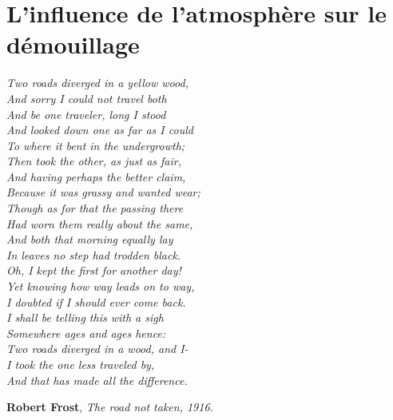\documentclass[12pt,french]{report}
\begin{document}
\setcounter{chapter}{3}
\chapter{L'influence de l'atmosphère sur le démouillage}
\begin{flushleft}
\textit{
Two roads diverged in a yellow wood,\\
And sorry I could not travel both\\
And be one traveler, long I stood\\
And looked down one as far as I could\\
To where it bent in the undergrowth;\\
\vspace{12pt}
Then took the other, as just as fair,\\
And having perhaps the better claim,\\
Because it was grassy and wanted wear;\\
Though as for that the passing there\\
Had worn them really about the same,\\
\vspace{12pt}
And both that morning equally lay\\
In leaves no step had trodden black.\\
Oh, I kept the first for another day!\\
Yet knowing how way leads on to way,\\
I doubted if I should ever come back.\\
\vspace{12pt}
I shall be telling this with a sigh\\
Somewhere ages and ages hence:\\
Two roads diverged in a wood, and I-\\
I took the one less traveled by,\\
And that has made all the difference.}
\end{flushleft}
\begin{flushright}
\textbf{Robert Frost}, \textit{The road not taken, 1916.}
\end{flushright}
\newpage


\end{document}
